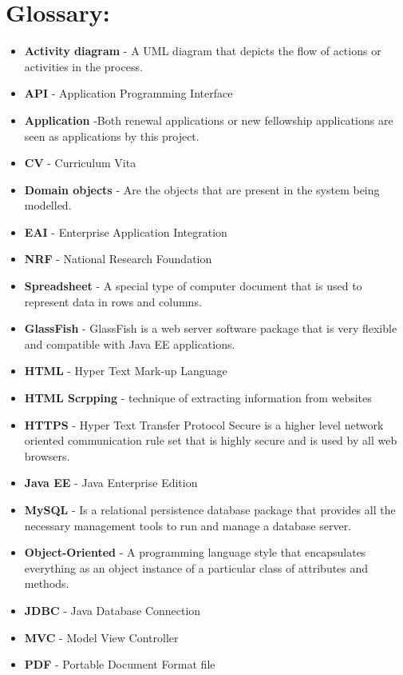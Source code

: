 \section{Glossary:}
\vspace{0.2in}

\begin{itemize}
\item \textbf{Activity diagram} - A UML diagram that depicts the flow of actions or activities in the process.
\item \textbf{API} - Application Programming Interface
\item \textbf{Application} -Both renewal applications or new fellowship applications are seen as applications by this project.
\item \textbf{CV} - Curriculum Vita
\item \textbf{Domain objects} - Are the objects that are present in the system being modelled.
\item \textbf{EAI} - Enterprise Application Integration
\item \textbf{NRF} - National Research Foundation
\item \textbf{Spreadsheet} - A special type of computer document that is used to represent data in rows and columns.
\item \textbf{GlassFish} - GlassFish is a web server software package that is very flexible and compatible with Java EE applications. 
\item \textbf{HTML} - Hyper Text Mark-up Language
\item \textbf{HTML Scrpping} -  technique of extracting information from websites
\item \textbf{HTTPS} - Hyper Text Transfer Protocol Secure is a higher level network oriented communication rule set that is highly secure and is used by all web browsers. 
\item \textbf{Java EE} - Java Enterprise Edition
\item \textbf{MySQL} - Is a relational persistence database package that provides all the necessary management tools to run and manage a database server.
\item \textbf{Object-Oriented} - A programming language style that encapsulates everything as an object instance of a particular class of attributes and methods.
\item \textbf{JDBC} - Java Database Connection
\item \textbf{MVC} - Model View Controller
\item \textbf{PDF} - Portable Document Format file

\end{itemize}
